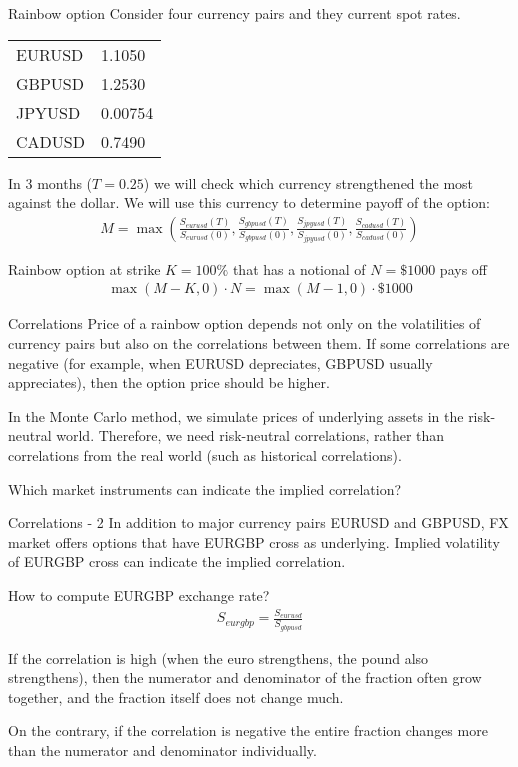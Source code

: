 \documentclass{beamer}
\begin{document}
\begin{frame}{Rainbow option}
\justify
Consider four currency pairs and they current spot rates.

\centering
\begin{tabular}{l|l}
EURUSD & 1.1050 \\
GBPUSD & 1.2530 \\
JPYUSD & 0.00754 \\
CADUSD & 0.7490
\end{tabular}

\justify
In 3 months ($T=0.25$) we will check which currency strengthened the most against the dollar. We will use this currency to determine payoff of the option:
\begin{align*}
M = \max\left(\frac{S_{eurusd}(T)}{S_{eurusd}(0)}, \frac{S_{gbpusd}(T)}{S_{gbpusd}(0)}, \frac{S_{jpyusd}(T)}{S_{jpyusd}(0)}, \frac{S_{cadusd}(T)}{S_{cadusd}(0)} \right)
\end{align*}

\justify 
Rainbow option at strike $K=100\%$ that has a notional of $N=\$1000$ pays off
\begin{align*}
\max(M - K, 0) \cdot N = \max(M-1, 0) \cdot \$1000
\end{align*}
\end{frame}



\begin{frame}{Correlations}
\justify
Price of a rainbow option depends not only on the volatilities of currency pairs but also on the correlations between them. If some correlations are negative (for example, when EURUSD depreciates, GBPUSD usually appreciates), then the option price should be higher.

\justify
In the Monte Carlo method, we simulate prices of underlying assets in the risk-neutral world. Therefore, we need risk-neutral correlations, rather than correlations from the real world (such as historical correlations).

\justify
Which market instruments can indicate the implied correlation?
\end{frame}



\begin{frame}{Correlations - 2}
\justify
In addition to major currency pairs EURUSD and GBPUSD, FX market offers options that have EURGBP cross as underlying. Implied volatility of EURGBP cross can indicate the implied correlation.

\justify
How to compute EURGBP exchange rate?
\begin{align*}
S_{eurgbp} = \frac{S_{eurusd}}{S_{gbpusd}}
\end{align*}

\justify
If the correlation is high (when the euro strengthens, the pound also strengthens), then the numerator and denominator of the fraction often grow together, and the fraction itself does not change much.

\justify
On the contrary, if the correlation is negative the entire fraction changes more than the numerator and denominator individually.
\end{frame}
\end{document}
